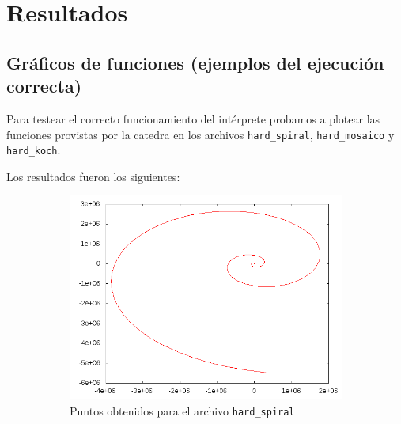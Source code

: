 \section{Resultados}

\subsection{Gr\'aficos de funciones (ejemplos del ejecuci\'on correcta)}

Para testear el correcto funcionamiento del int\'erprete probamos a plotear las 
funciones provistas por la catedra en los archivos \texttt{hard\_spiral},
\texttt{hard\_mosaico} y \texttt{hard\_koch}. 

Los resultados fueron los siguientes:

\begin{figure}[!ht]
        \centering
        \begin{subfigure}[b]{0.32\textwidth}
                \includegraphics[width=\textwidth]{imgResu/spiral.png}
                \caption{Puntos obtenidos para el archivo \texttt{hard\_spiral}}
        \end{subfigure}%
        ~ %
        \begin{subfigure}[b]{0.32\textwidth}

\end{subfigure}
\end{figure}
